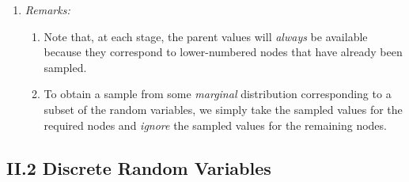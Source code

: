 \documentclass[12pt]{article}
\begin{document}
\begin{enumerate}[label=\textbf{\arabic*.}]
\begin{enumerate}
		\item \textit{Remarks:} 
		\begin{enumerate}
			\item Note that, at each stage, the parent values will \emph{always} be available because they correspond to lower-numbered nodes that have already been sampled. 
			\item To obtain a sample from some \emph{marginal} distribution corresponding to a subset of the random variables, we simply take the sampled values for the required nodes and \emph{ignore} the sampled values for the remaining nodes. 
		\end{enumerate}
		
	\end{enumerate}

\end{enumerate}

\subsection*{II.2 Discrete Random Variables}
\end{document}
